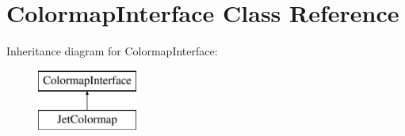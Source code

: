 \hypertarget{classColormapInterface}{
\section{ColormapInterface Class Reference}
\label{classColormapInterface}
}
Inheritance diagram for ColormapInterface:\begin{figure}[H]
\begin{center}
\leavevmode
\includegraphics[height=2.000000cm]{classColormapInterface}
\end{center}
\end{figure}
